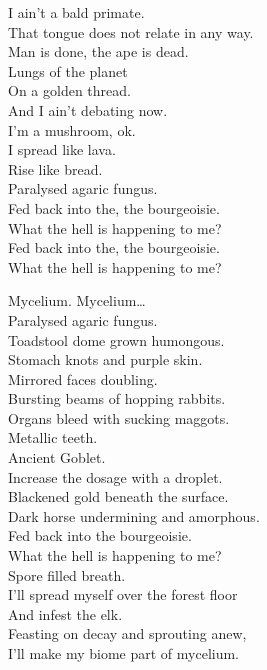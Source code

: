 I ain't a bald primate. \\
That tongue does not relate in any way. \\
Man is done, the ape is dead. \\
Lungs of the planet \\
On a golden thread. \\
And I ain't debating now. \\
I'm a mushroom, ok. \\
I spread like lava. \\
Rise like bread. \\
Paralysed agaric fungus. \\

Fed back into the, the bourgeoisie. \\
What the hell is happening to me? \\
Fed back into the, the bourgeoisie. \\
What the hell is happening to me? \\


Mycelium. Mycelium… \\

Paralysed agaric fungus. \\
Toadstool dome grown humongous. \\
Stomach knots and purple skin. \\
Mirrored faces doubling. \\
Bursting beams of hopping rabbits. \\
Organs bleed with sucking maggots. \\
Metallic teeth. \\
Ancient Goblet. \\
Increase the dosage with a droplet. \\
Blackened gold beneath the surface. \\

Dark horse undermining and amorphous. \\
Fed back into the bourgeoisie. \\
What the hell is happening to me? \\
Spore filled breath. \\
I'll spread myself over the forest floor \\
And infest the elk. \\
Feasting on decay and sprouting anew, \\
I'll make my biome part of mycelium. \\

